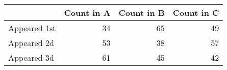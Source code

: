\begin{tabular}{lrrr}
\toprule
 & Count in A & Count in B & Count in C \\
\midrule
Appeared 1st & 34 & 65 & 49 \\
Appeared 2d & 53 & 38 & 57 \\
Appeared 3d & 61 & 45 & 42 \\
\bottomrule
\end{tabular}
